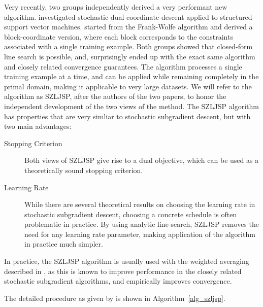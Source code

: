 Very recently, two groups independently derived a very performant new algorithm.
\citet{shalev2012proximal} investigated stochastic dual coordinate descent applied
to structured support vector machines. \citet{lacoste2012block} started from the Frank-Wolfe algorithm %
and derived a block-coordinate version, where each block corresponds to the
constraints associated with a single training example.  Both groups showed that
closed-form line search is possible, and, surprisingly ended up with the exact
same algorithm and closely related convergence guarantees.  The algorithm
processes a single training example at a time, and can be applied while
remaining completely in the primal domain, making it applicable to very large
datasets.  We will refer to the algorithm as SZLJSP, after the authors of the
two papers, to honor the independent development of the two views of the
method.
%
The SZLJSP algorithm has properties that are very simliar to
stochastic subgradient descent, but with two main advantages:
\begin{description}
\item[Stopping Criterion] Both views of SZLJSP give rise to a dual objective,
    which can be used as a theoretically sound stopping criterion.
\item[Learning Rate] While there are several theoretical results on choosing
    the learning rate in stochastic subgradient descent, choosing a concrete
    schedule is often problematic in practice. By using analytic line-search,
    SZLJSP removes the need for any learning rate parameter, making application
    of the algorithm in practice much simpler.
\end{description}

In practice, the SZLJSP algorithm is usually used with the weighted averaging
described in , as this is known to improve performance in the
closely related stochastic subgradient algorithms, and empirically improves
convergence.

The detailed procedure as given by \citet{lacoste2012block} is shown in Algorithm~\ref{alg_szljsp}.
